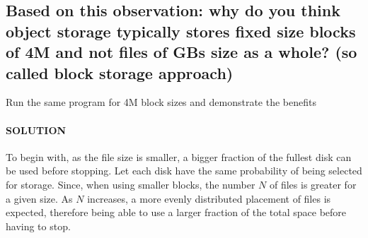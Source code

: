 \documentclass[11pt]{article}
\begin{document}
    \hypertarget{based-on-this-observation-why-do-you-think-object-storage-typically-stores-fixed-size-blocks-of-4m-and-not-files-of-gbs-size-as-a-whole-so-called-block-storage-approach}{%
\subsection{Based on this observation: why do you think object
storage typically stores fixed size blocks of 4M and not files of GBs
size as a whole? (so called block storage
approach)}\label{based-on-this-observation-why-do-you-think-object-storage-typically-stores-fixed-size-blocks-of-4m-and-not-files-of-gbs-size-as-a-whole-so-called-block-storage-approach}}

Run the same program for 4M block sizes and demonstrate the benefits

    \hypertarget{solution}{%
\paragraph{SOLUTION}\label{solution}}

To begin with, as the file size is smaller, a bigger fraction of the
fullest disk can be used before stopping. Let each disk have the same
probability of being selected for storage. Since, when using smaller
blocks, the number \(N\) of files is greater for a given size. As \(N\)
increases, a more evenly distributed placement of files is expected,
therefore being able to use a larger fraction of the total space before
having to stop.
\end{document}
